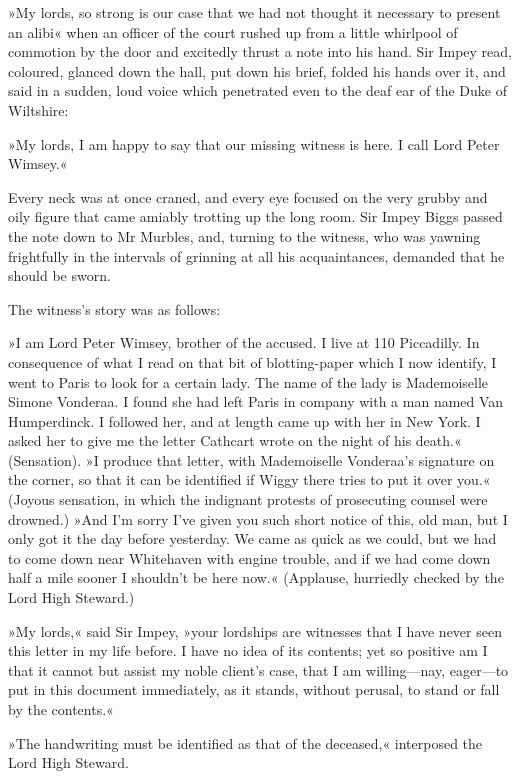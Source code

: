 »My lords, so strong is our case that we had not thought it necessary
to present an alibi\longdash« when an officer of the court rushed up from a
little whirlpool of commotion by the door and excitedly thrust a note
into his hand. Sir Impey read, coloured, glanced down the hall, put down
his brief, folded his hands over it, and said in a sudden, loud voice
which penetrated even to the deaf ear of the Duke of Wiltshire:

»My lords, I am happy to say that our missing witness is here. I call
Lord Peter Wimsey.«

Every neck was at once craned, and every eye focused on the very grubby
and oily figure that came amiably trotting up the long room. Sir Impey
Biggs passed the note down to Mr Murbles, and, turning to the witness,
who was yawning frightfully in the intervals of grinning at all his
acquaintances, demanded that he should be sworn.

The witness's story was as follows:

»I am Lord Peter Wimsey, brother of the accused. I live at 110
Piccadilly. In consequence of what I read on that bit of blotting-paper
which I now identify, I went to Paris to look for a certain lady. The
name of the lady is Mademoiselle Simone Vonderaa. I found she had
left Paris in company with a man named Van Humperdinck. I followed
her, and at length came up with her in New York. I asked her to give
me the letter Cathcart wrote on the night of his death.« (Sensation).
»I produce that letter, with Mademoiselle Vonderaa's signature on
the corner, so that it can be identified if Wiggy there tries to put
it over you.« (Joyous sensation, in which the indignant protests of
prosecuting counsel were drowned.) »And I'm sorry I've given you
such short notice of this, old man, but I only got it the day before
yesterday. We came as quick as we could, but we had to come down near
Whitehaven with engine trouble, and if we had come down half a mile
sooner I shouldn't be here now.« (Applause, hurriedly checked by the
Lord High Steward.)

»My lords,« said Sir Impey, »your lordships are witnesses that I
have never seen this letter in my life before. I have no idea of its
contents; yet so positive am I that it cannot but assist my noble
client's case, that I am willing—nay, eager—to put in this document
immediately, as it stands, without perusal, to stand or fall by the
contents.«

»The handwriting must be identified as that of the deceased,«
interposed the Lord High Steward.

